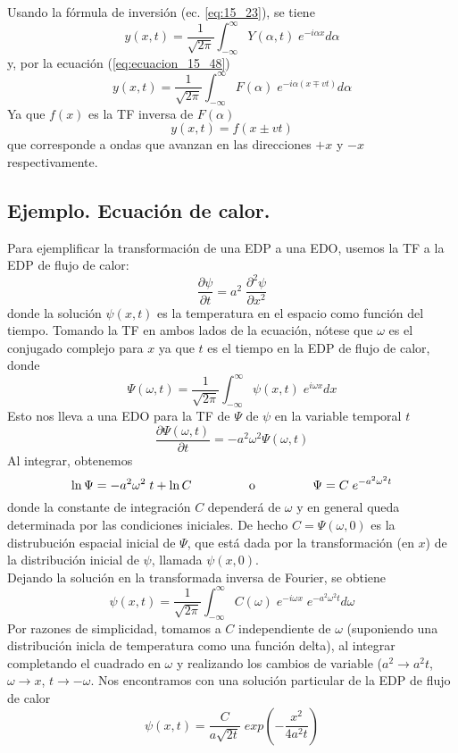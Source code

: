 Usando la fórmula de inversión (ec. \ref{eq:15_23}), se tiene
\begin{equation}
y(x,t) = \dfrac{1}{\sqrt{2 \pi}} \int_{-\infty}^{\infty} Y(\alpha, t) \; e^{-i \alpha x} d \alpha
\label{eq:ecuacion_15_49}
\end{equation}
y, por la ecuación (\ref{eq:ecuacion_15_48})
\begin{equation}
y(x,t) = \dfrac{1}{\sqrt{2 \pi}} \int_{-\infty}^{\infty} F(\alpha) \; e^{- i \alpha (x \mp v t)} d \alpha
\label{eq:ecuacion_15_50}
\end{equation}
Ya que $f(x)$ es la TF inversa de $F(\alpha)$
\begin{equation}
y(x, t) = f (x \pm v t)
\label{eq:ecuacion_15_51}
\end{equation}
que corresponde a ondas que avanzan en las direcciones $+x$ y $-x$ respectivamente.
\subsection*{Ejemplo. Ecuación de calor.}
Para ejemplificar la transformación de una EDP a una EDO, usemos la TF a la EDP de flujo de calor:
\[ \dfrac{\partial \psi}{\partial t} = a^{2} \; \dfrac{\partial^{2} \psi}{\partial x^{2}} \]
donde la solución $\psi(x,t)$ es la temperatura en el espacio como función del tiempo. Tomando la TF en ambos lados de la ecuación, nótese que $\omega$ es el conjugado complejo para $x$ ya que $t$ es el tiempo en la EDP de flujo de calor, donde
\[ \Psi(\omega, t) = \dfrac{1}{\sqrt{2 \pi}} \int_{-\infty}^{\infty} \psi(x, t) \; e^{i \omega x} dx \]
Esto nos lleva a una EDO para la TF de $\Psi$ de $\psi$ en la variable temporal $t$
\[ \dfrac{\partial \Psi(\omega, t)}{\partial t} = -a^{2} \omega^{2} \Psi(\omega, t) \] 
Al integrar, obtenemos
\[ \ln \Psi = -a^{2} \omega^{2} \; t + \ln C \hspace{1.5cm} \text{ o } \hspace{1.5cm} \Psi = C \; e^{-a^{2} \omega^{2} t}\]
donde la constante de integración $C$ dependerá de $\omega$ y en general queda determinada por las condiciones iniciales. De hecho $C = \Psi(\omega, 0)$ es la distrubución espacial inicial de $\Psi$, que está dada por la transformación (en $x$) de la distribución inicial de $\psi$, llamada $\psi(x,0)$.
\\
Dejando la solución en la transformada inversa de Fourier, se obtiene
\[ \psi(x, t) = \dfrac{1}{\sqrt{2 \pi}} \int_{-\infty}^{\infty} C(\omega) \; e^{-i \omega x} \; e^{-a^{2} \omega^{2} t} d \omega \]
Por razones de simplicidad, tomamos a $C$ independiente de $\omega$ (suponiendo una distribución inicla de temperatura como una función delta), al integrar completando el cuadrado en $\omega$ y realizando los cambios de variable ($a^{2} \to a^{2}t$, $\omega \to x$, $t \to -\omega$. Nos encontramos con una solución particular de la EDP de flujo de calor
\[ \psi(x,t) = \dfrac{C}{a \sqrt{2 t}} \; exp \left( - \dfrac{x^{2}}{4 a^{2} t} \right) \]

